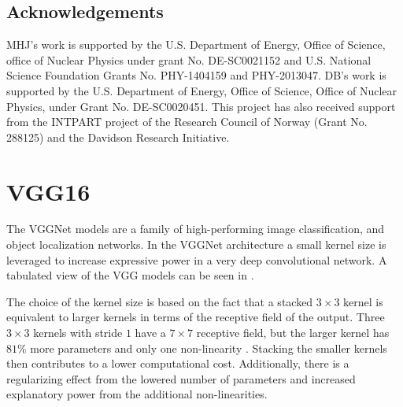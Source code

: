 \documentclass[review,sort&compress]{elsarticle}
\begin{document}



\subsection*{Acknowledgements}
MHJ’s work is supported by the U.S. Department of Energy, Office of Science, office of Nuclear Physics under grant No. DE-SC0021152 and U.S. National Science Foundation Grants No. PHY-1404159 and PHY-2013047. DB's work is supported by the U.S. Department of Energy, Office of Science, Office of Nuclear Physics, under Grant No. DE-SC0020451. This project has also received support from the INTPART project of the Research Council of Norway (Grant No. 288125) and the Davidson Research Initiative. 

\appendix  

\section{VGG16}\label{app:vgg}

The VGGNet models are a family of high-performing image classification, and object localization networks. In the VGGNet architecture a small kernel size is leveraged to increase expressive power in a very deep convolutional network. A tabulated view of the VGG models can be seen in \cite{Simonyan2014}. 

The choice of the kernel size is based on the fact that a stacked $3 \times 3$ kernel is equivalent to larger kernels in terms of the receptive field of the output. Three $3 \times 3$ kernels with stride $1$ have a $7 \times 7$ receptive field, but the larger kernel has $81\%$ more parameters and only one non-linearity \cite{Simonyan2014}. Stacking the smaller kernels then contributes to a lower computational cost. Additionally, there is a regularizing effect from the lowered number of parameters and increased explanatory power from the additional non-linearities.
\end{document}
